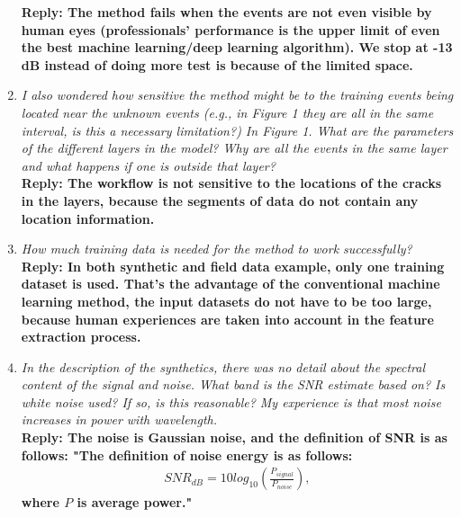 \begin{enumerate}
\textbf{Reply: The method fails when the events are not even visible by human eyes (professionals' performance is the upper limit of even the best machine learning/deep learning algorithm). We stop at -13 dB instead of doing more test is because of the limited space. }\\

\item \textsl{ I also wondered how sensitive the method might be to the training events being located near the unknown events (e.g., in Figure 1 they are all in the same interval, is this a necessary limitation?) 
In Figure 1. What are the parameters of the different layers in the model? Why are all the events in the same layer and what happens if one is outside that layer?}\\

\textbf{Reply: The workflow is not sensitive to the locations of the cracks in the layers, because the segments of data do not contain any location information.}\\

\item \textsl{ How much training data is needed for the method to work successfully?}\\

\textbf{Reply: In both synthetic and field data example, only one training dataset is used. That's the advantage of the conventional machine learning method, the input datasets do not have to be too large, because human experiences are taken into account in the feature extraction process. }\\

\item \textsl{In the description of the synthetics, there was no detail about the spectral content of the signal and noise. What band is the SNR estimate based on? Is white noise used? If so, is this reasonable? My experience is that most noise increases in power with wavelength.}\\

\textbf{Reply: The noise is Gaussian noise, and the definition of SNR is as follows:
"The definition of noise energy is as follows:
\begin{equation}
\begin{split}
      SNR_{dB} = 10 log_{10}\left( \frac{P_{signal}}{P_{noise}} \right),
\label{eq2}
\end{split}
\end{equation}
where $P$ is average power."}\\


\end{enumerate}
